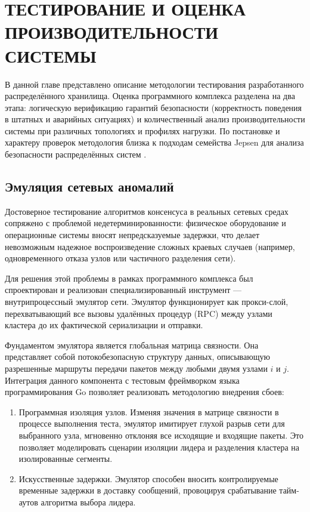 \chapter{ТЕСТИРОВАНИЕ И ОЦЕНКА ПРОИЗВОДИТЕЛЬНОСТИ СИСТЕМЫ}

В данной главе представлено описание методологии тестирования разработанного распределённого хранилища. Оценка программного комплекса разделена на два этапа: логическую верификацию гарантий безопасности (корректность поведения в штатных и аварийных ситуациях) и количественный анализ производительности системы при различных топологиях и профилях нагрузки. По постановке и характеру проверок методология близка к подходам семейства Jepsen для анализа безопасности распределённых систем \cite{jepsen}.

\section{Эмуляция сетевых аномалий}

Достоверное тестирование алгоритмов консенсуса в реальных сетевых средах сопряжено с проблемой недетерминированности: физическое оборудование и операционные системы вносят непредсказуемые задержки, что делает невозможным надежное воспроизведение сложных краевых случаев (например, одновременного отказа узлов или частичного разделения сети). 

Для решения этой проблемы в рамках программного комплекса был спроектирован и реализован специализированный инструмент — внутрипроцессный эмулятор сети. Эмулятор функционирует как прокси-слой, перехватывающий все вызовы удалённых процедур (RPC) между узлами кластера до их фактической сериализации и отправки.

Фундаментом эмулятора является глобальная матрица связности. Она представляет собой потокобезопасную структуру данных, описывающую разрешенные маршруты передачи пакетов между любыми двумя узлами $i$ и $j$. Интеграция данного компонента с тестовым фреймворком языка программирования Go позволяет реализовать методологию внедрения сбоев:

\begin{enumerate}
    \item Программная изоляция узлов. Изменяя значения в матрице связности в процессе выполнения теста, эмулятор имитирует глухой разрыв сети для выбранного узла, мгновенно отклоняя все исходящие и входящие пакеты. Это позволяет моделировать сценарии изоляции лидера и разделения кластера на изолированные сегменты.
    \item Искусственные задержки. Эмулятор способен вносить контролируемые временные задержки в доставку сообщений, провоцируя срабатывание тайм-аутов алгоритма выбора лидера.
\end{enumerate}

